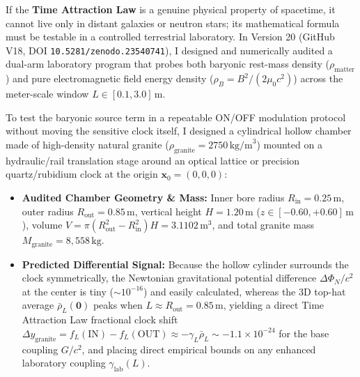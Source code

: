 
If the \textbf{Time Attraction Law} is a genuine physical property of spacetime, it cannot live only in distant galaxies or neutron stars; its mathematical formula must be testable in a controlled terrestrial laboratory. In Version 20 (GitHub V18, DOI \texttt{10.5281/zenodo.23540741}), I designed and numerically audited a dual-arm laboratory program that probes both baryonic rest-mass density ($\rho_{\text{matter}}$) and pure electromagnetic field energy density ($\rho_B = B^2/(2\mu_0 c^2)$) across the meter-scale window $L \in [0.1, 3.0]\,\text{m}$.

\par
To test the baryonic source term in a repeatable ON/OFF modulation protocol without moving the sensitive clock itself, I designed a cylindrical hollow chamber made of high-density natural granite ($\rho_{\text{granite}} = 2750\,\text{kg/m}^3$) mounted on a hydraulic/rail translation stage around an optical lattice or precision quartz/rubidium clock at the origin $\mathbf{x}_0 = (0,0,0)$:
\begin{itemize}\setlength{\itemsep}{1pt}\setlength{\parskip}{0pt}\setlength{\topsep}{1pt}
  \item \textbf{Audited Chamber Geometry \& Mass:} Inner bore radius $R_{\text{in}} = 0.25\,\text{m}$, outer radius $R_{\text{out}} = 0.85\,\text{m}$, vertical height $H = 1.20\,\text{m}$ ($z \in [-0.60, +0.60]\,\text{m}$), volume $V = \pi(R_{\text{out}}^2 - R_{\text{in}}^2)H = 3.1102\,\text{m}^3$, and total granite mass \textbf{$M_{\text{granite}} = 8,558\,\text{kg}$}.
  \item \textbf{Predicted Differential Signal:} Because the hollow cylinder surrounds the clock symmetrically, the Newtonian gravitational potential difference $\Delta\Phi_N/c^2$ at the center is tiny ($\sim 10^{-16}$) and easily calculated, whereas the 3D top-hat average $\bar{\rho}_L(\mathbf{0})$ peaks when $L \approx R_{\text{out}} = 0.85\,\text{m}$, yielding a direct Time Attraction Law fractional clock shift $\Delta y_{\text{granite}} = f_L(\text{IN}) - f_L(\text{OUT}) \approx -\gamma_L\bar{\rho}_L \sim -1.1\times 10^{-24}$ for the base coupling $G/c^2$, and placing direct empirical bounds on any enhanced laboratory coupling $\gamma_{\text{lab}}(L)$.
\end{itemize}

